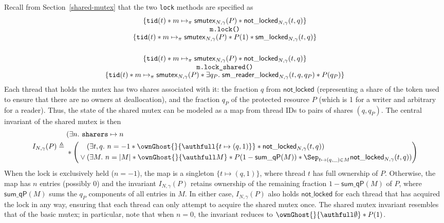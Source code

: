 Recall from Section~\ref{shared-mutex} that the two \lstinline{lock} methods are specified as
\[\begin{array}{@{}c@{}}
\{\currentthread{t} \ast m \mapsto_\pi \smutex{N, \gamma}{P}\ast\notlocked{N, \gamma}{t}{q}\} \\
  \texttt{m.lock()} \\[-1pt]
\{\currentthread{t} \ast m \mapsto_\pi \smutex{N, \gamma}{P}\ast P(1)\ast\smlocked{N, \gamma}{t}{q}\} \\[1.8em]

\{\currentthread{t} \ast m \mapsto_\pi \smutex{N, \gamma}{P}\ast\notlocked{N, \gamma}{t}{q}\}\\
  \texttt{m.lock\_shared()} \\[-1pt]
\{\currentthread{t} \ast m \mapsto_\pi \smutex{N, \gamma}{P}\ast\exists q_P.\;\smreaderlocked{N, \gamma}{t}{q}{q_P} \ast P(q_P)\} \end{array}\]
Each thread that holds the mutex has two shares associated with it: the fraction $q$ from $\mathsf{not\_locked}$ (representing a share of the token used to ensure that there are no owners at deallocation), and the fraction $q_P$ of the protected resource $P$ (which is 1 for a writer and arbitrary for a reader). Thus, the state of the shared mutex can be modeled as a map from thread IDs to pairs of shares $(q, q_P)$. The central invariant of the shared mutex is then
\[  I_{N, \gamma}(P) \triangleq \begin{aligned}
    &(\exists n.\ \texttt{sharers} \mapsto n \\
    &{}\ast \left(\begin{aligned}
      &(\exists t, q.\ n = -1 \ast \ownGhost{}{\authfull \{t \mapsto (q, 1)\}} \ast \notlocked{N, \gamma}{t}{q}) \\
      {}\vee{} &(\exists M.\ n = |M| \ast \ownGhost{}{\authfull M} \ast P(1 - \mathsf{sum\_qP}(M)) \ast \Sep_{t \mapsto (q, \_) \in M} \notlocked{N, \gamma}{t}{q})
    \end{aligned}\right)
  \end{aligned}
\]
When the lock is exclusively held ($n =-1$), the map is a singleton $\{t \mapsto (q, 1)\}$, where thread $t$ has full ownership of $P$. Otherwise, the map has $n$ entries (possibly 0) and the invariant $I_{N, \gamma}(P)$ retains ownership of the remaining fraction $1 - \mathsf{sum\_qP}(M)$ of $P$, where $\mathsf{sum\_qP}(M)$ sums the $q_P$ components of all entries in $M$. In either case, $I_{N, \gamma}(P)$ also holds $\mathsf{not\_locked}$ for each thread that has acquired the lock in any way, ensuring that each thread can only attempt to acquire the shared mutex once. The shared mutex invariant resembles that of the basic mutex; in particular, note that when $n = 0$, the invariant reduces to $\ownGhost{}{\authfull \emptyset} \ast P(1)$.

